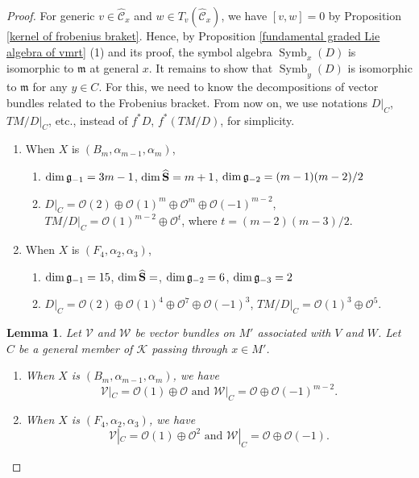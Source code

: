 \documentclass[12pt]{amsart}
\theoremstyle{plain}
\newtheorem{lemma} [theorem]{Lemma}
\theoremstyle{definition}
\def\Symb{\operatorname{Symb}}
\begin{document}
\begin{proof}
For generic $v \in \widehat {\mathcal C}_x$ and $w \in T_v(\widehat{\mathcal C}_x)$, we have $[v,w]=0$ by Proposition \ref{kernel of frobenius braket}. Hence, by Proposition \ref{fundamental graded Lie algebra of vmrt} (1) and its proof, the symbol algebra $\Symb_x(D)$ is isomorphic to $\mathfrak m$ at general $x$. It remains to show that $\Symb_y(D)$ is isomorphic to $\mathfrak m$ for any $y \in C$. For this, we need to know the decompositions of vector bundles related to the Frobenius bracket. From now on,  we use notations $D|_C$, $TM/D|_C$, etc., instead of $f^*D$, $f^*(TM/D)$, for simplicity.

\begin{enumerate}
\item  When $X$ is $(B_m, \alpha_{m-1}, \alpha_m)$,
\begin{enumerate}
\item $\dim \frak g_{-1} = 3m-1$, $\dim \widehat{\bf S} =m+1$, $\dim \frak g_{-2} = (m-1)(m-2)/2$
\item $D|_C=\mathcal O(2) \oplus \mathcal O(1)^m \oplus \mathcal O^m \oplus \mathcal O(-1)^{m-2}$, $TM/D|_C = \mathcal O(1)^{m-2} \oplus \mathcal O^t$, where $t=(m-2)(m-3)/2$.
\end{enumerate} %

\item When $X$ is $(F_4, \alpha_2, \alpha_3)$,
\begin{enumerate}
\item $\dim \frak g_{-1} = 15$, $\dim \widehat{\bf S} =$, $\dim \frak g_{-2} = 6$, $\dim \frak g_{-3} = 2$
\item $D|_C=\mathcal O(2) \oplus \mathcal O(1)^4 \oplus \mathcal O^7 \oplus \mathcal O(-1)^{3}$, $TM/D|_C = \mathcal O(1)^{3} \oplus \mathcal O^5$.
\end{enumerate}

\end{enumerate}


\begin{lemma}   \label{lem:splitting type of V}
Let $\mathcal V$ and $\mathcal W $ be vector bundles on $M'$ associated with $V$ and $W$.
Let $C$ be a general member of $\mathcal K$ passing through $x \in M'$.
\begin{enumerate}
 \item  When $X$ is $(B_m, \alpha_{m-1}, \alpha_m)$, we have
$$\mathcal V|_C= \mathcal O(1) \oplus \mathcal O \text{ and } \mathcal W|_C= \mathcal O \oplus \mathcal O(-1)^{m-2}.  $$

 \item  When $X$ is $(F_4, \alpha_2, \alpha_3)$,
 we have
$$\mathcal V|_C= \mathcal O(1) \oplus \mathcal O^2 \text{ and } \mathcal W|_C= \mathcal O \oplus \mathcal O(-1)  .$$


\end{enumerate}
\end{lemma}
\end{proof}
\end{document}
